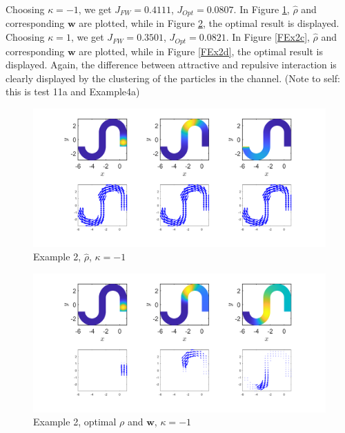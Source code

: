 \documentclass[11pt, a4paper]{article}
\theoremstyle{definition}
\newcommand{\w}{\mathbf{w}}
\begin{document}
Choosing $\kappa = -1$, we get $J_{FW} =  0.4111$, $J_{Opt} =  0.0807$. In Figure \ref{FEx2a}, $\widehat \rho$ and corresponding $\w$ are plotted, while in Figure \ref{FEx2b}, the optimal result is displayed. Choosing $\kappa = 1$, we get $J_{FW} =  0.3501$, $J_{Opt} =  0.0821$. In Figure \ref{FEx2c}, $\widehat \rho$ and corresponding $\w$ are plotted, while in Figure \ref{FEx2d}, the optimal result is displayed. Again, the difference between attractive and repulsive interaction is clearly displayed by the clustering of the particles in the channel. (Note to self: this is test 11a and Example4a) 
\begin{figure}[h]
	\centering
	\includegraphics[scale=0.3]{FW2n1.png}
	\caption{Example 2, $\widehat \rho$, $\kappa = -1$} 
	\label{FEx2a}
\end{figure}
\begin{figure}[h]
	\centering
	\includegraphics[scale=0.3]{Opt2n1.png}
	\caption{Example 2, optimal $\rho$ and $\w$, $\kappa = -1$} 
	\label{FEx2b}
\end{figure}
\end{document}
